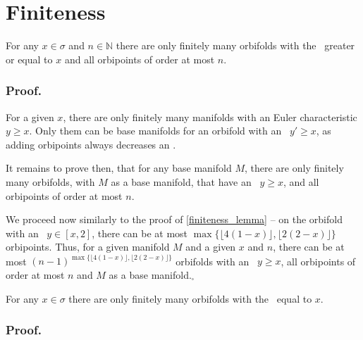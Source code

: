 \section{Finiteness}\label{finiteness}


\begin{observation}\label{first_finiteness_theorem}
For any $x \in \sigma$ and $n \in \mathbb{N}$ there are only finitely many orbifolds 
with the \Eoc\ greater or equal to $x$ and all orbipoints of order at most $n$.
\end{observation}
\subsubsection{Proof.} 

For a given $x$, there are only finitely many manifolds 
with an Euler characteristic $y \geq x$. Only them can be 
base manifolds for an orbifold with an \Eoc\ $y'\geq x$, as adding orbipoints always 
decreases an \Eoc. 

It remains to prove then, that for any base manifold $M$, there are only finitely many orbifolds, 
with $M$ as a base manifold, that have 
 an \Eoc\ $y \geq x$, and all orbipoints of order at most $n$.

We proceed now similarly to the proof of \ref{finiteness_lemma} -- 
on the orbifold with an \Eoc\ $y \in [x,2]$, there can be at most 
$\max \{\lfloor 4(1-x) \rfloor, \lfloor 2(2-x) \rfloor\}$ orbipoints. 
Thus, for a given manifold $M$ and a given $x$ and $n$, there can be at most 
$(n-1)^{\max \{\lfloor 4(1-x) \rfloor, \lfloor 2(2-x) \rfloor\}}$ orbifolds with an \Eoc\ 
$y \geq x$, 
all orbipoints of order at most $n$ and $M$ as a base manifold.$_\square$ 

\begin{theorem}\label{second_finiteness_theorem}
For any $x \in \sigma$ there are only finitely many orbifolds 
with the \Eoc\ equal to $x$.
\end{theorem}
\subsubsection{Proof.} 

